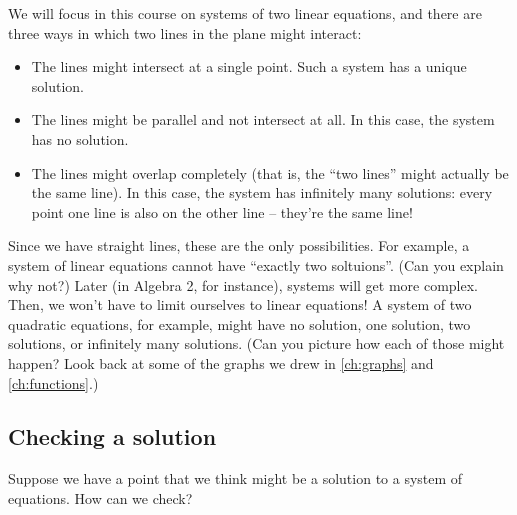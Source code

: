 We will focus in this course on systems of two linear equations, and there are three ways in which two lines in the plane might interact:
\begin{itemize}
\item The lines might intersect at a single point. Such a system has a unique solution.

\item The lines might be parallel and not intersect at all. In this case, the system has no solution.

\item The lines might overlap completely (that is, the ``two lines'' might actually be the same line). In this case, the system has infinitely many solutions: every point one line is also on the other line -- they're the same line!
\end{itemize}

Since we have straight lines, these are the only possibilities. For example, a system of linear equations cannot have ``exactly two soltuions''. (Can you explain why not?) Later (in Algebra 2, for instance), systems will get more complex. Then, we won't have to limit ourselves to linear equations! A system of two quadratic equations, for example, might have no solution, one solution, two solutions, or infinitely many solutions. (Can you picture how each of those might happen? Look back at some of the graphs we drew in \cref{ch:graphs} and \cref{ch:functions}.)


\subsection{Checking a solution}

Suppose we have a point that we think might be a solution to a system of equations. How can we check?

